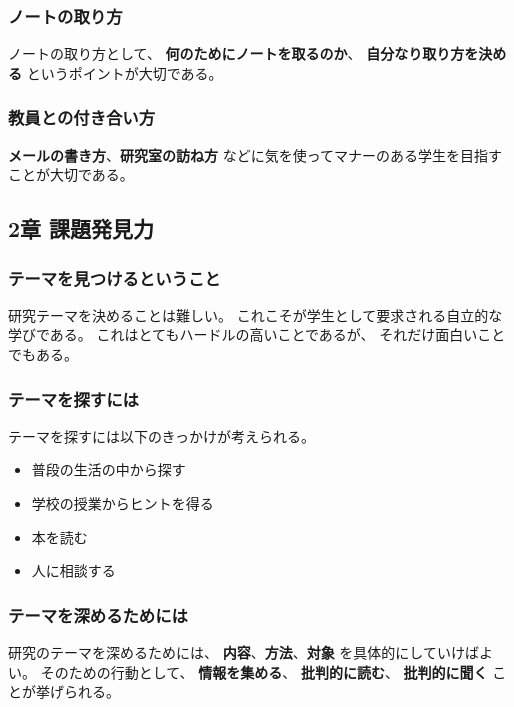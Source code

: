\documentclass[]{jsarticle}
\begin{document}
        \subsubsection*{ノートの取り方}
            ノートの取り方として、
            {\bf 何のためにノートを取るのか}、
            {\bf 自分なり取り方を決める}
            というポイントが大切である。

        \subsubsection*{教員との付き合い方}
            {\bf メールの書き方}、{\bf 研究室の訪ね方}
            などに気を使ってマナーのある学生を目指すことが大切である。

    \subsection{2章 課題発見力}
        \subsubsection*{テーマを見つけるということ}
            研究テーマを決めることは難しい。
            これこそが学生として要求される自立的な学びである。
            これはとてもハードルの高いことであるが、
            それだけ面白いことでもある。

        \subsubsection*{テーマを探すには}
            テーマを探すには以下のきっかけが考えられる。

            \begin{itemize}
                \item 普段の生活の中から探す
                \item 学校の授業からヒントを得る
                \item 本を読む
                \item 人に相談する
            \end{itemize}

        \subsubsection*{テーマを深めるためには}
            研究のテーマを深めるためには、
            {\bf 内容}、{\bf 方法}、{\bf 対象}
            を具体的にしていけばよい。
            そのための行動として、
            {\bf 情報を集める}、
            {\bf 批判的に読む}、
            {\bf 批判的に聞く}
            ことが挙げられる。
\end{document}
